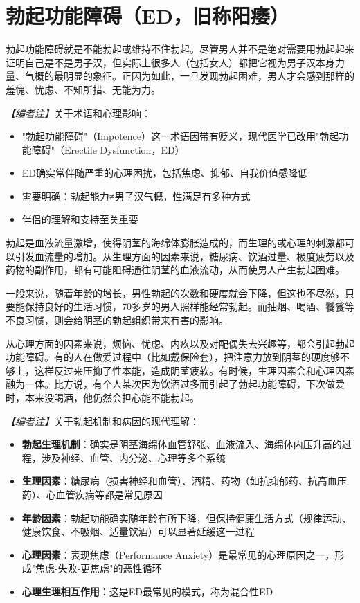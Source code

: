 \section{勃起功能障碍（ED，旧称阳痿）}

勃起功能障碍就是不能勃起或维持不住勃起。尽管男人并不是绝对需要用勃起起来证明自己是不是男子汉，但实际上很多人（包括女人）都把它视为男子汉本身力量、气概的最明显的象征。正因为如此，一旦发现勃起困难，男人才会感到那样的羞愧、忧虑、不知所措、无能为力。

\noindent\textit{【编者注】}关于术语和心理影响：
\begin{itemize}
	\item "勃起功能障碍"（Impotence）这一术语因带有贬义，现代医学已改用"勃起功能障碍"（Erectile Dysfunction，ED）
	\item ED确实常伴随严重的心理困扰，包括焦虑、抑郁、自我价值感降低
	\item 需要明确：勃起能力≠男子汉气概，性满足有多种方式
	\item 伴侣的理解和支持至关重要
\end{itemize}

勃起是血液流量激增，使得阴茎的海绵体膨胀造成的，而生理的或心理的刺激都可以引发血流量的增加。从生理方面的因素来说，糖尿病、饮酒过量、极度疲劳以及药物的副作用，都有可能阻碍通往阴茎的血液流动，从而使男人产生勃起困难。

一般来说，随着年龄的增长，男性勃起的次数和硬度就会下降，但这也不尽然，只要能保持良好的生活习惯，70多岁的男人照样能经常勃起。而抽烟、喝酒、饕餮等不良习惯，则会给阴茎的勃起组织带来有害的影响。

从心理方面的因素来说，烦恼、忧虑、内疚以及对配偶失去兴趣等，都会引起勃起功能障碍。有的人在做爱过程中（比如戴保险套），把注意力放到阴茎的硬度够不够上，这样反过来压抑了性本能，造成阴茎疲软。有时候，生理因素会和心理因素融为一体。比方说，有个人某次因为饮酒过多而引起了勃起功能障碍，下次做爱时，本来没喝酒，他仍然会担心能不能勃起。

\noindent\textit{【编者注】}关于勃起机制和病因的现代理解：
\begin{itemize}
	\item \textbf{勃起生理机制}：确实是阴茎海绵体血管舒张、血液流入、海绵体内压升高的过程，涉及神经、血管、内分泌、心理等多个系统
	\item \textbf{生理因素}：糖尿病（损害神经和血管）、酒精、药物（如抗抑郁药、抗高血压药）、心血管疾病等都是常见原因
	\item \textbf{年龄因素}：勃起功能确实随年龄有所下降，但保持健康生活方式（规律运动、健康饮食、不吸烟、适量饮酒）可以显著延缓这一过程
	\item \textbf{心理因素}：表现焦虑（Performance Anxiety）是最常见的心理原因之一，形成"焦虑-失败-更焦虑"的恶性循环
	\item \textbf{心理生理相互作用}：这是ED最常见的模式，称为混合性ED
\end{itemize}

